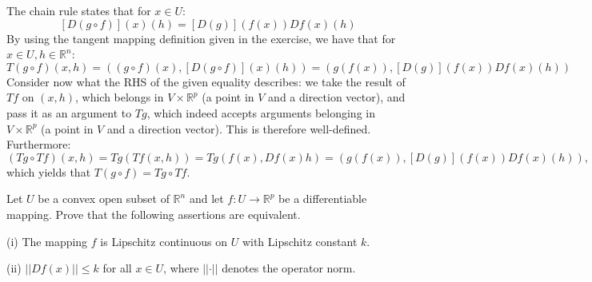 \begin{solution}

    The chain rule states that for $x \in U$:
    $$[D(g \circ f)](x)(h) = [D(g)](f(x))Df(x)(h)$$
    By using the tangent mapping definition given in the exercise, we have that for $x \in U, h \in \mathbb{R}^n$:
    $$T(g \circ f)(x, h) = ((g \circ f)(x), [D(g \circ f)](x)(h)) = (g(f(x)), [D(g)](f(x))Df(x)(h))$$
    Consider now what the RHS of the given equality describes: we take the result of $Tf$ on $(x, h)$, which belongs in $V \times \mathbb{R}^p$ (a point in $V$ and a direction vector), and pass it as an argument to $Tg$, which indeed accepts arguments belonging in $V \times \mathbb{R}^p$ (a point in $V$ and a direction vector).
    This is therefore well-defined.
    Furthermore:
    $$(Tg \circ Tf)(x, h) = Tg(Tf(x, h)) = Tg(f(x), Df(x)h) = (g(f(x)), [D(g)](f(x))Df(x)(h)),$$
    which yields that $T(g \circ f) = Tg \circ Tf$.
\end{solution}

\begin{exercise}{24}
    Let $U$ be a convex open subset of $\mathbb{R}^n$ and let $f: U \rightarrow \mathbb{R}^p$ be a differentiable mapping.
    Prove that the following assertions are equivalent.

    (i) The mapping $f$ is Lipschitz continuous on $U$ with Lipschitz constant $k$.

    (ii) $\lvert \lvert D f(x) \rvert \rvert \leq k$ for all $x \in U$, where $\lvert \lvert \cdot \rvert \rvert$ denotes the operator norm.
\end{exercise}

